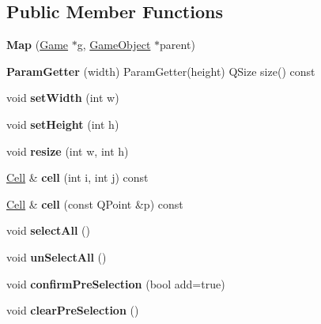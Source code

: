 \subsection*{Public Member Functions}
\begin{DoxyCompactItemize}
\item 
\hypertarget{class_map_a9779d0a2a759441c5e8d51b0a9c4cd40}{}\label{class_map_a9779d0a2a759441c5e8d51b0a9c4cd40} 
{\bfseries Map} (\hyperlink{class_game}{Game} $\ast$g, \hyperlink{class_game_object}{Game\+Object} $\ast$parent)
\item 
\hypertarget{class_map_aeb4e7ef5671f73086050dc425a3fc1b8}{}\label{class_map_aeb4e7ef5671f73086050dc425a3fc1b8} 
{\bfseries Param\+Getter} (width) Param\+Getter(height) Q\+Size size() const
\item 
\hypertarget{class_map_a2915ccde4d8a2ba8142677baea803467}{}\label{class_map_a2915ccde4d8a2ba8142677baea803467} 
void {\bfseries set\+Width} (int w)
\item 
\hypertarget{class_map_affab3537641a7985559f83ea083e00ca}{}\label{class_map_affab3537641a7985559f83ea083e00ca} 
void {\bfseries set\+Height} (int h)
\item 
\hypertarget{class_map_a5f7c31af6620d00ce8a812c8710345ab}{}\label{class_map_a5f7c31af6620d00ce8a812c8710345ab} 
void {\bfseries resize} (int w, int h)
\item 
\hypertarget{class_map_a6c7c4be0e4c5f04dfc37223bb4e132a7}{}\label{class_map_a6c7c4be0e4c5f04dfc37223bb4e132a7} 
\hyperlink{class_cell}{Cell} \& {\bfseries cell} (int i, int j) const
\item 
\hypertarget{class_map_afe9bf6f6b502d61e48949b5417bfdbb2}{}\label{class_map_afe9bf6f6b502d61e48949b5417bfdbb2} 
\hyperlink{class_cell}{Cell} \& {\bfseries cell} (const Q\+Point \&p) const
\item 
\hypertarget{class_map_a16aea6b5c9de3a26b094d964885b33b7}{}\label{class_map_a16aea6b5c9de3a26b094d964885b33b7} 
void {\bfseries select\+All} ()
\item 
\hypertarget{class_map_a5b85190575503a09c5c6de012da64f7c}{}\label{class_map_a5b85190575503a09c5c6de012da64f7c} 
void {\bfseries un\+Select\+All} ()
\item 
\hypertarget{class_map_a89cab58d82e08dacfe0b97899bab5501}{}\label{class_map_a89cab58d82e08dacfe0b97899bab5501} 
void {\bfseries confirm\+Pre\+Selection} (bool add=true)
\item 
\hypertarget{class_map_a0a637f44f0a59c3a67b6a507ae710c7f}{}\label{class_map_a0a637f44f0a59c3a67b6a507ae710c7f} 
void {\bfseries clear\+Pre\+Selection} ()
\end{DoxyCompactItemize}
